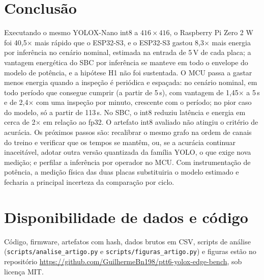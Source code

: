 \documentclass[11pt,a4paper]{article}
\begin{document}
\section{Conclusão}
Executando o mesmo YOLOX-Nano int8 a $416\times416$, o Raspberry Pi Zero 2 W foi 40,5$\times$ mais rápido que o
ESP32-S3, e o ESP32-S3 gastou 8,3$\times$ mais energia por inferência no cenário nominal, estimada na entrada de
5\,V de cada placa; a
vantagem energética do SBC por inferência se manteve em todo o envelope do modelo de potência, e a hipótese H1 não
foi sustentada. O MCU passa a gastar menos energia quando a inspeção é periódica e espaçada: no cenário nominal, em
todo período que consegue cumprir (a partir de 5\,s), com vantagem de 1,45$\times$ a 5\,s e de 2,4$\times$ com uma
inspeção por minuto, crescente com o período; no pior caso do modelo, só a partir de 113\,s. No SBC, o int8 reduziu latência e energia em cerca de 2$\times$ em relação ao fp32.
O artefato int8 avaliado não atingiu o critério de acurácia. Os próximos passos são: recalibrar o mesmo grafo na
ordem de canais do treino e verificar que os tempos se mantêm, ou, se a acurácia continuar inaceitável, adotar
outra versão quantizada da família YOLO, o que exige nova medição; e perfilar a inferência por operador no MCU.
Com instrumentação de potência, a medição física das duas placas substituiria o modelo estimado e fecharia a
principal incerteza da comparação por ciclo.

\section*{Disponibilidade de dados e código}
Código, firmware, artefatos com hash, dados brutos em CSV, scripts de análise
(\texttt{scripts/\allowbreak analise\_artigo.py} e \texttt{scripts/\allowbreak figuras\_artigo.py}) e figuras estão no repositório
\url{https://github.com/GuilhermeBn198/ptt6-yolox-edge-bench}, sob licença MIT.



\end{document}
